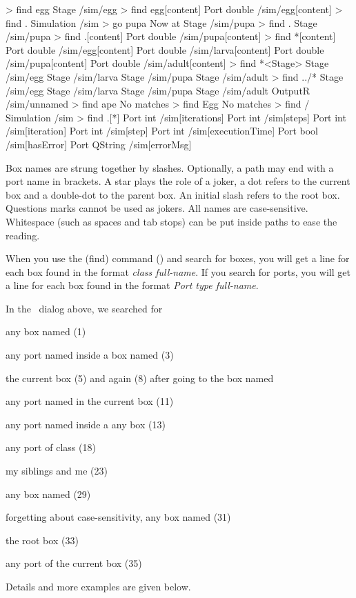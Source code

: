 \lstset{numbers=left}
\begin{usdialog}
> find egg
Stage /sim/egg
> find egg[content]
Port double /sim/egg[content]
> find .
Simulation /sim
> go pupa
Now at Stage /sim/pupa
> find .
Stage /sim/pupa
> find .[content]
Port double /sim/pupa[content]
> find *[content]
Port double /sim/egg[content]
Port double /sim/larva[content]
Port double /sim/pupa[content]
Port double /sim/adult[content]
> find *<Stage>
Stage /sim/egg
Stage /sim/larva
Stage /sim/pupa
Stage /sim/adult
> find ../*
Stage /sim/egg
Stage /sim/larva
Stage /sim/pupa
Stage /sim/adult
OutputR /sim/unnamed
> find ape
No matches
> find Egg
No matches
> find /
Simulation /sim
> find .[*]
Port int     /sim[iterations]
Port int     /sim[steps]
Port int     /sim[iteration]
Port int     /sim[step]
Port int     /sim[executionTime]
Port bool    /sim[hasError]
Port QString /sim[errorMsg]
\end{usdialog}
\lstset{numbers=none}

Box names are strung together by slashes. Optionally, a path may end with a port name in brackets. A star plays the role of a joker, a dot refers to the current box and a double-dot to the parent box. An initial slash refers to the root box. Questions marks cannot be used as jokers. All names are case-sensitive. Whitespace (such as spaces and tab stops) can be put inside paths to ease the reading.

When you use the \code(find) command () and search for boxes, you will get a line for each box found in the format \textit{class full-name}. If you search for ports, you will get a line for each box found in the format \textit{Port type full-name}.

In the \US\ dialog above, we searched for 
\begin{compactitem}
\item any box named  (1)
\item any port named  inside a box named  (3)
\item the current box (5) and again (8) after going to the box named 
\item any port named  in the current box (11)
\item any port named  inside a any box (13)
\item any port of class  (18)
\item my siblings and me (23)
\item any box named  (29)
\item forgetting about case-sensitivity, any box named  (31)
\item the root box (33)
\item any port of the current box (35)
\end{compactitem}
Details and more examples are given below.

